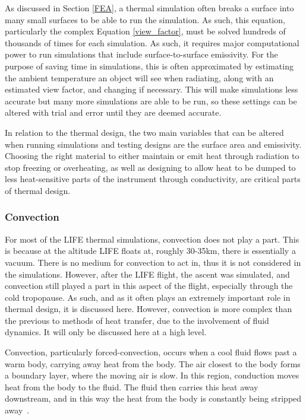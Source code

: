 As discussed in Section \ref{FEA}, a thermal simulation often breaks a surface into many small surfaces to be able to run the simulation. As such, this equation, particularly the complex Equation \ref{view_factor}, must be solved hundreds of thousands of times for each simulation. As such, it requires major computational power to run simulations that include surface-to-surface emissivity. For the purpose of saving time in simulations, this is often approximated by estimating the ambient temperature an object will see when radiating, along with an estimated view factor, and changing if necessary. This will make simulations less accurate but many more simulations are able to be run, so these settings can be altered with trial and error until they are deemed accurate.

 In relation to the thermal design, the two main variables that can be altered when running simulations and testing designs are the surface area and emissivity. Choosing the right material to either maintain or emit heat through radiation to stop freezing or overheating, as well as designing to allow heat to be dumped to less heat-sensitive parts of the instrument through conductivity, are critical parts of thermal design.

\subsubsection{Convection}\label{convection_sec}
For most of the LIFE thermal simulations, convection does not play a part. This is because at the altitude LIFE floats at, roughly 30-35km, there is essentially a vacuum. There is no medium for convection to act in, thus it is not considered in the simulations. However, after the LIFE flight, the ascent was simulated, and convection still played a part in this aspect of the flight, especially through the cold tropopause. As such, and as it often plays an extremely important role in thermal design, it is discussed here. However, convection is more complex than the previous to methods of heat transfer, due to the involvement of fluid dynamics. It will only be discussed here at a high level.

Convection, particularly forced-convection, occurs when a cool fluid flows past a warm body, carrying away heat from the body. The air closest to the body forms a boundary layer, where the moving air is slow. In this region, conduction moves heat from the body to the fluid. The fluid then carries this heat away downstream, and in this way the heat from the body is constantly being stripped away~\citep{heat_transfer_textbook}.

